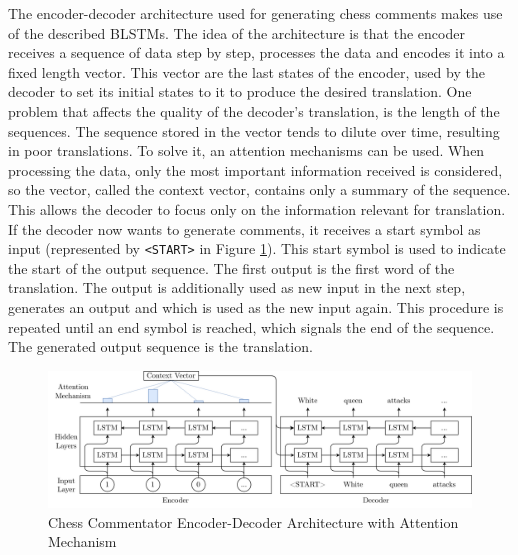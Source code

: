 The encoder-decoder architecture used for generating chess comments makes use of the described BLSTMs. The idea of the architecture is that the encoder receives a sequence of data step by step, processes the data and encodes it into a fixed length vector. This vector are the last states of the encoder, used by the decoder to set its initial states to it to produce the desired translation. One problem that affects the quality of the decoder's translation, is the length of the sequences. The sequence stored in the vector tends to dilute over time, resulting in poor translations. To solve it, an attention mechanisms can be used. When processing the data, only the most important information received is considered, so the vector, called the context vector, contains only a summary of the sequence. This allows the decoder to focus only on the information relevant for translation. If the decoder now wants to generate comments, it receives a start symbol as input (represented by \texttt{<START>} in Figure \ref{fig:eda}). This start symbol is used to indicate the start of the output sequence. The first output is the first word of the translation. The output is additionally used as new input in the next step, generates an output and which is used as the new input again. This procedure is repeated until an end symbol is reached, which signals the end of the sequence. The generated output sequence is the translation.

\begin{figure}[h]
\includegraphics[width=1\textwidth]{graphics/commentator_example/general_approach.png}
\caption{Chess Commentator Encoder-Decoder Architecture with Attention Mechanism}
\label{fig:eda}
\end{figure}